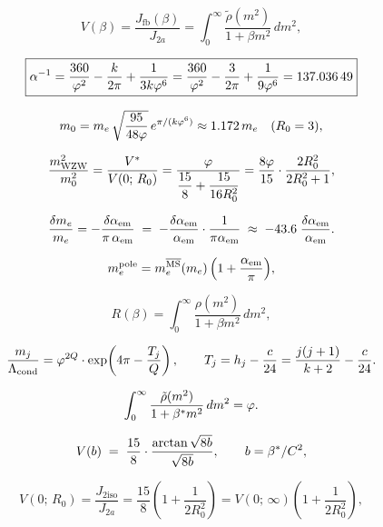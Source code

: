 \begin{equation}
  V(\beta)
  = \frac{J_\mathrm{fb}(\beta)}{J_{2a}}
  = \int_0^\infty \frac{\tilde\rho(m^2)}{1+\beta m^2}\,dm^2,
  \label{P4:eq:V_spectral}
\end{equation}

\begin{equation}
  \boxed{
  \alpha^{-1} = \frac{360}{\varphi^2} - \frac{k}{2\pi} + \frac{1}{3k\varphi^6}
        = \frac{360}{\varphi^2} - \frac{3}{2\pi} + \frac{1}{9\varphi^6}
        = 137.036\,49
  }
\end{equation}

\begin{equation}
  m_0 = m_e\,\sqrt{\frac{95}{48\varphi}}\,e^{\pi/(k\varphi^6)} \approx 1.172\,m_e
  \quad (R_0=3),
\end{equation}

\begin{equation}
  \frac{m_{\mathrm{WZW}}^2}{m_0^2}
  = \frac{V^*}{V(0;\,R_0)}
  = \frac{\varphi}{\dfrac{15}{8}+\dfrac{15}{16R_0^2}}
  = \frac{8\varphi}{15}\cdot\frac{2R_0^2}{2R_0^2+1},
\end{equation}

\begin{equation}
  \frac{\delta m_e}{m_e} = -\frac{\delta\alpha_{\mathrm{em}}}{\pi\,\alpha_{\mathrm{em}}}
  \;=\; -\frac{\delta\alpha_{\mathrm{em}}}{\alpha_{\mathrm{em}}}\cdot\frac{1}{\pi\alpha_{\mathrm{em}}}
  \;\approx\; -43.6\;\frac{\delta\alpha_{\mathrm{em}}}{\alpha_{\mathrm{em}}}.
  \label{P4:eq:me_alpha_sensitivity}
\end{equation}

\begin{equation}
  m_e^{\mathrm{pole}} = m_e^{\overline{\mathrm{MS}}}(m_e)\,
  \Bigl(1 + \frac{\alpha_{\mathrm{em}}}{\pi}\Bigr),
\end{equation}

\begin{equation}
  R(\beta) = \int_0^\infty \frac{\rho(m^2)}{1 + \beta m^2}\,dm^2,
  \label{P4:eq:spectral}
\end{equation}

\begin{equation}
  \frac{m_j}{\Lambda_{\mathrm{cond}}}
  = \varphi^{2Q}\cdot\exp\!\left(4\pi - \frac{T_j}{Q}\right),
  \qquad
  T_j = h_j - \frac{c}{24} = \frac{j(j+1)}{k+2} - \frac{c}{24}.
\end{equation}

\begin{equation}
  \int_0^\infty \frac{\tilde\rho(m^2)}{1+\beta^{*} m^2}\,dm^2 = \varphi.
  \label{P4:eq:vfp_spectral}
\end{equation}

\begin{equation}
  V(b) \;=\; \frac{15}{8}\cdot\frac{\arctan\sqrt{8b}}{\sqrt{8b}},
  \qquad b = \beta^{*}/C^2,
  \label{P4:eq:virial}
\end{equation}

\begin{equation}
  V(0;\,R_0)
  = \frac{J_{2\mathrm{iso}}}{J_{2a}}
  = \frac{15}{8}\!\left(1 + \frac{1}{2R_0^2}\right)
  = V(0;\,\infty)\!\left(1 + \frac{1}{2R_0^2}\right),
\end{equation}

